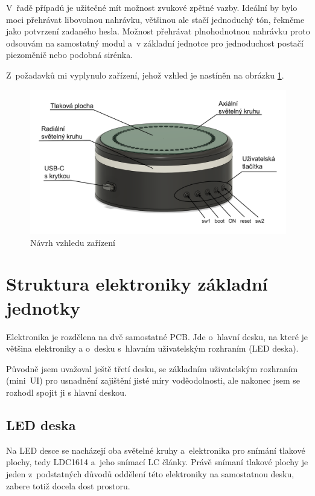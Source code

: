 V~řadě případů je užitečné mít možnost zvukové zpětné vazby.
Ideální by bylo moci přehrávat libovolnou nahrávku, většinou ale stačí jednoduchý tón, řekněme jako potvrzení zadaného hesla.
Možnost přehrávat plnohodnotnou nahrávku proto odsouvám na samostatný modul a~v základní jednotce pro jednoduchost postačí piezoměnič nebo podobná sirénka.

Z~požadavků mi vyplynulo zařízení, jehož vzhled je nastíněn na obrázku \ref{fig:AHS-nacrt}.
\begin{figure}
    \centering
    \includegraphics[width=\textwidth]{text/PraktickaCast/img/AHS-nacrt.png}
    \caption{Návrh vzhledu zařízení}
    \label{fig:AHS-nacrt}
\end{figure}

\newpage
\section{Struktura elektroniky základní jednotky}

Elektronika je rozdělena na dvě samostatné PCB.
Jde o~hlavní desku, na které je většina elektroniky a o~desku s~hlavním uživatelským rozhraním (LED deska).

Původně jsem uvažoval ještě třetí desku, se základním uživatelským rozhraním (mini~UI) pro usnadnění zajištění jisté míry voděodolnosti, ale nakonec jsem se rozhodl spojit ji s hlavní deskou.

\subsection{LED deska}
Na LED desce se nacházejí oba světelné kruhy a~elektronika pro snímání tlakové plochy, tedy LDC1614 \cite{LDC1614} a~jeho snímací LC články.
Právě snímaní tlakové plochy je jeden z~podstatných důvodů oddělení této elektroniky na samostatnou desku, zabere totiž docela dost prostoru.

